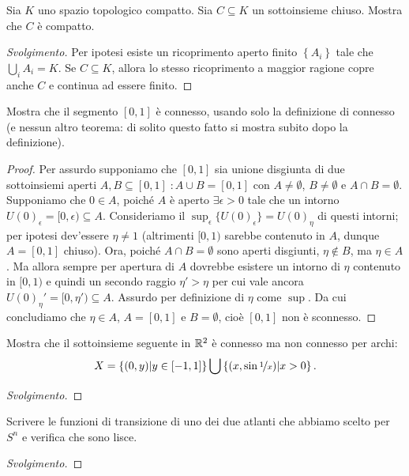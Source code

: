 \documentclass[a4paper, 12pt, italian]{article}
\begin{document}
\begin{exercise}
Sia $K$ uno spazio topologico compatto. Sia $C \subseteq K$ un sottoinsieme
chiuso. Mostra che $C$ è compatto.
\begin{proof}[Svolgimento]
Per ipotesi esiste un ricoprimento aperto finito $\left\{A_i\right\}$ tale
che $\bigcup_i A_i = K$. Se $C \subseteq K$, allora lo stesso ricoprimento
a maggior ragione copre anche $C$ e continua ad essere finito.
\end{proof}
\end{exercise}

\begin{exercise}
Mostra che il segmento $[0, 1]$ è connesso, usando solo la definizione di
connesso (e nessun altro teorema: di solito questo fatto si mostra subito dopo
la definizione).
\begin{proof}
Per assurdo supponiamo che $[0, 1]$ sia unione disgiunta di due sottoinsiemi
aperti $A, B \subseteq [0, 1] \; : A \cup B = [0, 1]$ con
$A \neq \emptyset$, $B \neq \emptyset$ e $A \cap B = \emptyset$.
Supponiamo che $0 \in A$, poiché $A$ è aperto $\exists \epsilon > 0$
tale che un intorno $U(0)_\epsilon = [0, \epsilon) \subseteq A$.
Consideriamo il $\sup_\epsilon \{U(0)_\epsilon\} = U(0)_\eta$ di questi
intorni; per ipotesi dev'essere $\eta \neq 1$ (altrimenti $[0, 1)$ sarebbe
contenuto in $A$, dunque $A = [0, 1]$ chiuso). Ora, poiché 
$A \cap B = \emptyset$ sono aperti disgiunti, $\eta \not\in B$, ma
$\eta \in A$. Ma allora sempre per apertura di $A$ dovrebbe esistere un
intorno di $\eta$ contenuto in $[0, 1)$ e quindi un secondo raggio 
$\eta' > \eta$ per cui vale ancora $U(0)_\eta' = [0, \eta') \subseteq A$.
Assurdo per definizione di $\eta$ come $\sup$. Da cui concludiamo che
$\eta \in A$, $A = [0, 1]$ e $B = \emptyset$, cioè $[0, 1]$ non è
sconnesso.

\end{proof}
\end{exercise}

\begin{exercise}
Mostra che il sottoinsieme seguente in $\mathbb{R}^2$ è connesso ma non connesso per
archi:
\[
X = \left\{(0, y) | y \in [-1, 1]\right\} \bigcup
\left\{(x, \sin{\nicefrac{1}{x}}) | x > 0\right\}
.\]
\begin{proof}[Svolgimento]

\end{proof}
\end{exercise}

\begin{exercise}
Scrivere le funzioni di transizione di uno dei due atlanti che abbiamo scelto
per $S^n$ e verifica che sono lisce.
\begin{proof}[Svolgimento]

\end{proof}
\end{exercise}
\end{document}
